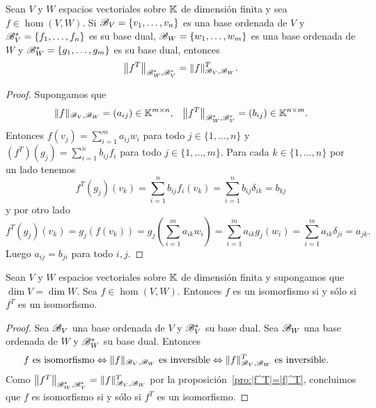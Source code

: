 \begin{prop}
    \label{pro:|f^T|=|f|^T}
    Sean $V$ y $W$ espacios vectoriales sobre $\mathbb{K}$ de dimensión finita y sea
    $f\in\hom(V,W)$. Si $\mathscr{B}_V=\{v_1,\dots,v_n\}$ es una base ordenada de $V$ y
    $\mathscr{B}_V^*=\{f_1,\dots,f_n\}$ es su base dual, $\mathscr{B}_W=\{w_1,\dots,w_m\}$ es
    una base ordenada de $W$ y $\mathscr{B}_W^*=\{g_1,\dots,g_m\}$  es su base dual,
    entonces 
    \[
        \left\|f^T\right\|_{\mathscr{B}_W^*,\mathscr{B}_V^*}=\|f\|_{\mathscr{B}_V,\mathscr{B}_W}^T.           
    \]

    \begin{proof}
        Supongamos que 
        \begin{align*}
            \|f\|_{\mathscr{B}_V,\mathscr{B}_W}=(a_{ij})\in\mathbb{K}^{m\times n},
            &&
            \left\|f^T\right\|_{\mathscr{B}_W^*,\mathscr{B}_V^*}=(b_{ij})\in\mathbb{K}^{n\times m}. 
        \end{align*}
        Entonces $f(v_j)=\sum_{i=1}^m a_{ij}w_i$ para todo $j\in\{1,\dots,n\}$ y
        $\left(f^T\right)(g_j)=\sum_{i=1}^n b_{ij}f_i$ para todo $j\in\{1,\dots,m\}$. 
        Para cada $k\in\{1,\dots,n\}$ por un lado tenemos
        \[
        f^T(g_j)(v_k)=\sum_{i=1}^n b_{ij}f_i(v_k)=\sum_{i=1}^n b_{ij}\delta_{ik}=b_{kj}
        \]  
        y por otro lado
        \[
        f^T(g_j)(v_k)=g_j(f(v_k))=g_j\left(\sum_{i=1}^m a_{ik}w_i\right)=\sum_{i=1}^m a_{ik}g_j(w_i)=\sum_{i=1}^m a_{ik}\delta_{ji}=a_{jk}.
        \]
        Luego $a_{ij}=b_{ji}$ para todo $i,j$.
    \end{proof}
\end{prop}

\begin{prop}
    \label{pro:f_iso<=>f^T_iso}
    Sean $V$ y $W$ espacios vectoriales sobre $\mathbb{K}$ de dimensión finita y
    supongamos que $\dim V=\dim W$. Sea $f\in\hom(V,W)$. Entonces $f$ es un
    isomorfismo si y sólo si $f^T$ es un isomorfismo.

    \begin{proof}
        Sea $\mathscr{B}_V$ una base ordenada de $V$ y $\mathscr{B}_V^*$ su base dual. Sea
        $\mathscr{B}_W$ una base ordenada de $W$ y $\mathscr{B}_W^*$ su base dual. Entonces 
        \begin{align*}
            f\text{ es isomorfismo} &\Leftrightarrow \|f\|_{\mathscr{B}_V,\mathscr{B}_W}\text{ es inversible}
            \Leftrightarrow \|f\|_{\mathscr{B}_V,\mathscr{B}_W}^T\text{ es inversible}. 
        \end{align*}
        Como $\left\|f^T\right\|_{\mathscr{B}_W^*,\mathscr{B}_V^*}=\|f\|_{\mathscr{B}_V,\mathscr{B}_W}^T$ por
        la proposición~\ref{pro:|f^T|=|f|^T}, concluimos que $f$ es isomorfismo
        si y sólo si $f^T$ es un isomorfismo.
    \end{proof}
\end{prop}


